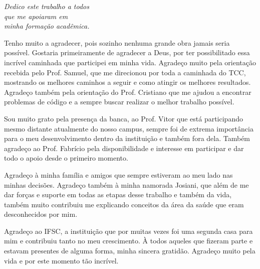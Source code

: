 \documentclass[
	10pt,				%
	oneside,
	a4paper,			%
	chapter=TITLE,		%
	english,			%
	brazil				%
	]{abntex2}
\begin{document}
\begin{dedicatoria}
   \vspace*{\fill}
   \begin{flushright}
   \noindent
   \textit{Dedico este trabalho a todos \\ que me apoiaram em \\ minha formação acadêmica.}\vspace*{2cm}
   \end{flushright}
\end{dedicatoria}

\begin{agradecimentos}

Tenho muito a agradecer, pois sozinho nenhuma grande obra jamais seria possível. Gostaria primeiramente de agradecer a Deus, por ter possibilitado essa incrível caminhada que participei em minha vida. Agradeço muito pela orientação recebida pelo Prof. Samuel, que me direcionou por toda a caminhada do TCC, mostrando os melhores caminhos a seguir e como atingir os melhores resultados. Agradeço também pela orientação do Prof. Cristiano que me ajudou a encontrar problemas de código e a sempre buscar realizar o melhor trabalho possível.

Sou muito grato pela presença da banca, ao Prof. Vitor que está participando mesmo distante atualmente do nosso campus, sempre foi de extrema importância para o meu desenvolvimento dentro da instituição e também fora dela. Também agradeço ao Prof. Fabrício pela disponibilidade e interesse em participar e dar todo o apoio desde o primeiro momento.

Agradeço à minha família e amigos que sempre estiveram ao meu lado nas minhas decisões. Agradeço também à minha namorada Josiani, que além de me dar forças e suporte em todas as etapas desse trabalho e também da vida, também muito contribuiu me explicando conceitos da área da saúde que eram desconhecidos por mim.

Agradeço ao IFSC, a instituição que por muitas vezes foi uma segunda casa para mim e contribuiu tanto no meu crescimento. À todos aqueles que fizeram parte e estavam presentes de alguma forma, minha sincera gratidão. Agradeço muito pela vida e por este momento tão incrível.

\end{agradecimentos}
\end{document}
